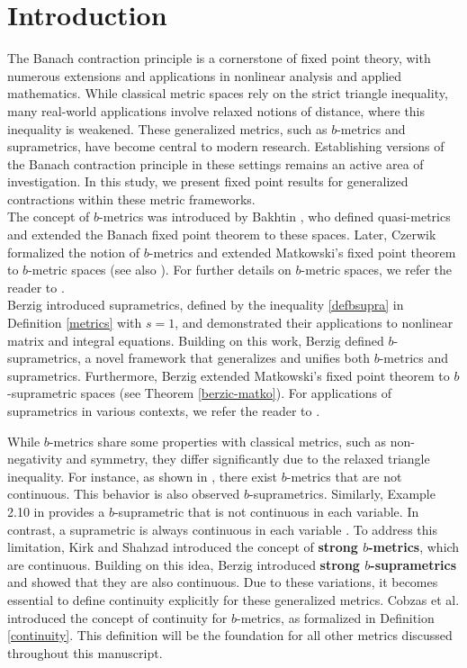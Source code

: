 \documentclass[pdflatex,sn-mathphys-num]{sn-jnl}%
\theoremstyle{thmstyleone}%
\theoremstyle{thmstyletwo}%
\theoremstyle{thmstylethree}%
\begin{document}
\section{Introduction}\label{sec1}
The Banach contraction principle is a cornerstone of fixed point theory, with numerous extensions and applications in nonlinear analysis and applied mathematics. While classical metric spaces rely on the strict triangle inequality, many real-world applications involve relaxed notions of distance, where this inequality is weakened. These generalized metrics, such as \( b \)-metrics and suprametrics, have become central to modern research. Establishing versions of the Banach contraction principle in these settings remains an active area of investigation. In this study, we present fixed point results for generalized contractions within these metric frameworks.\\
The concept of \( b \)-metrics was introduced by Bakhtin \cite{bakhtin1989contraction}, who defined quasi-metrics and extended the Banach fixed point theorem to these spaces. Later, Czerwik \cite{czerwik1993contraction} formalized the notion of \( b \)-metrics and extended Matkowski's fixed point theorem to \( b \)-metric spaces (see also \cite{kajanto2018note}). For further details on \( b \)-metric spaces, we refer the reader to \cite{karapinar2018short, berinde2022early}.\\
Berzig \cite{berzig2022first} introduced suprametrics, defined by the inequality \eqref{defbsupra} in Definition \ref{metrics} with \( s = 1 \), and demonstrated their applications to nonlinear matrix and integral equations. Building on this work, Berzig \cite{berzig2024nonlinear} defined \( b \)-suprametrics, a novel framework that generalizes and unifies both \( b \)-metrics and suprametrics. Furthermore, Berzig extended Matkowski's fixed point theorem to \( b \)-suprametric spaces (see Theorem \ref{berzic-matko}). For applications of suprametrics in various contexts, we refer the reader to \cite{panda2023extended, panda2023numerical}.

While \( b \)-metrics share some properties with classical metrics, such as non-negativity and symmetry, they differ significantly due to the relaxed triangle inequality. For instance, as shown in \cite{lu2019fundamental}, there exist \( b \)-metrics that are not continuous. This behavior is also observed \( b \)-suprametrics. Similarly, Example 2.10 in \cite{berzig2024nonlinear} provides a \( b \)-suprametric that is not continuous in each variable. In contrast, a suprametric is always continuous in each variable \cite{berzig2022first}. To address this limitation, Kirk and Shahzad \cite{kirk2014fixed} introduced the concept of \textbf{strong \( b \)-metrics}, which are continuous. Building on this idea, Berzig \cite{berzig2024strong} introduced \textbf{strong \( b \)-suprametrics} and showed that they are also continuous. Due to these variations, it becomes essential to define continuity explicitly for these generalized metrics. Cobzas et al. \cite{cobzas2020completion} introduced the concept of continuity for \( b \)-metrics, as formalized in Definition \ref{continuity}. This definition will be the foundation for all other metrics discussed throughout this manuscript.
\end{document}
